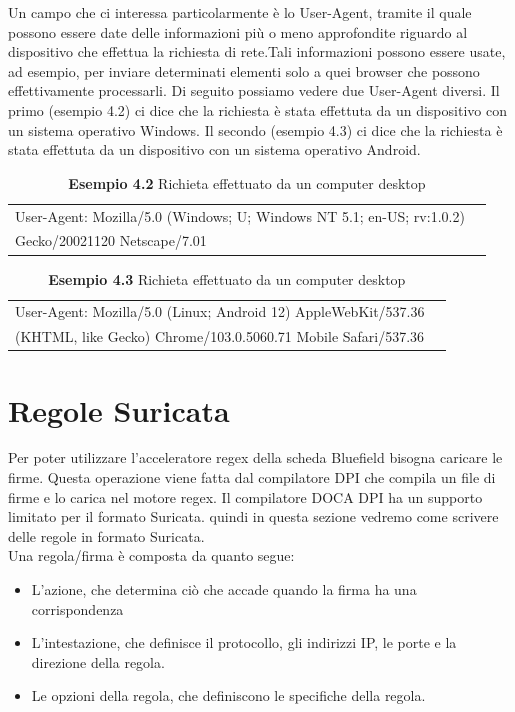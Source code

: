 \documentclass[binding=0.6cm]{sapthesis}
\theoremstyle{definition}
\begin{document}
Un campo che ci interessa particolarmente è lo User-Agent,
tramite il quale possono essere date delle informazioni più o meno approfondite riguardo al 
dispositivo che effettua la richiesta di rete.Tali informazioni possono essere usate, ad esempio, 
per inviare determinati elementi solo a quei browser che possono effettivamente processarli.
Di seguito possiamo vedere due User-Agent diversi. Il primo (esempio 4.2) ci dice 
che la richiesta è stata effettuta da un dispositivo con un sistema operativo Windows.
Il secondo (esempio 4.3) ci dice 
che la richiesta è stata effettuta da un dispositivo con un sistema operativo Android.
\begin{table}[ht]
    \centering
    \caption*{\textbf{Esempio 4.2} Richieta effettuato da un computer desktop}
    \begin{tabular}{ |l|c|}
        \hline
        {User-Agent}: Mozilla/5.0 (Windows; U; Windows NT 5.1; en-US; rv:1.0.2) \\Gecko/20021120 Netscape/7.01\\
         
        \hline
    \end{tabular}

\end{table}


\begin{table}[ht]
    \centering
    \caption*{\textbf{Esempio 4.3} Richieta effettuato da un computer desktop}
    \begin{tabular}{ |l|c|}
        \hline
        {User-Agent}: Mozilla/5.0 (Linux; Android 12) AppleWebKit/537.36 \\(KHTML, like Gecko) Chrome/103.0.5060.71 Mobile Safari/537.36\\
        \hline
    \end{tabular}

\end{table}


\section{Regole Suricata}
\label{chapter:suricata}
Per poter utilizzare l'acceleratore regex della scheda Bluefield bisogna caricare le firme. 
Questa operazione viene fatta dal compilatore DPI che compila un file di firme e lo carica nel 
motore regex.
Il compilatore DOCA DPI ha un supporto limitato per il formato Suricata. 
quindi in questa sezione vedremo come scrivere delle regole in formato Suricata.\\
Una regola/firma è composta da quanto segue:
\begin{itemize}
    \item L'azione, che determina ciò che accade quando la firma ha una corrispondenza 
    \item L'intestazione, che definisce il protocollo, gli indirizzi IP, le porte e la direzione della regola.
    \item Le opzioni della regola, che definiscono le specifiche della regola.
\end{itemize}
\end{document}
